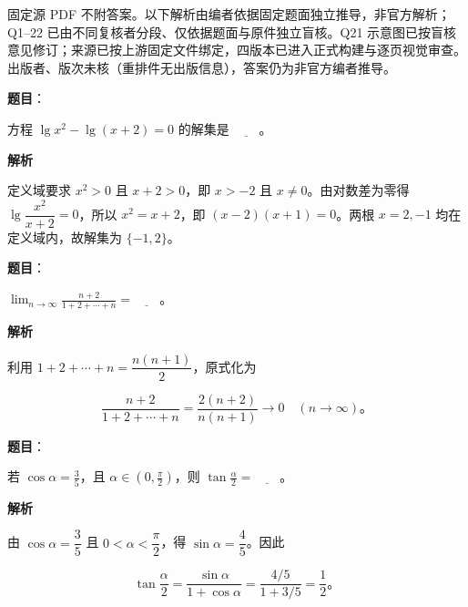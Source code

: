 

\begin{gktip}
固定源 PDF 不附答案。以下解析由编者依据固定题面独立推导，非官方解析；Q1–22 已由不同复核者分段、仅依据题面与原件独立盲核。Q21 示意图已按盲核意见修订；来源已按上游固定文件绑定，四版本已进入正式构建与逐页视觉审查。出版者、版次未核（重排件无出版信息），答案仍为非官方编者推导。
\end{gktip}

\begin{answer}

\textbf{题目}：

方程 $\lg x^2-\lg(x+2)=0$ 的解集是 $\underline{\qquad}$。

\textbf{解析}

定义域要求 $x^2>0$ 且 $x+2>0$，即 $x>-2$ 且 $x\ne0$。由对数差为零得 $\lg\dfrac{x^2}{x+2}=0$，所以 $x^2=x+2$，即 $(x-2)(x+1)=0$。两根 $x=2,-1$ 均在定义域内，故解集为 $\{-1,2\}$。


\end{answer}
\begin{answer}

\textbf{题目}：

$\displaystyle\lim_{n\to\infty}\frac{n+2}{1+2+\cdots+n}=\underline{\qquad}$。

\textbf{解析}

利用 $1+2+\cdots+n=\dfrac{n(n+1)}2$，原式化为

\nopagebreak[4]
\[
\frac{n+2}{1+2+\cdots+n}=\frac{2(n+2)}{n(n+1)}\longrightarrow0\quad(n\to\infty)\mbox{。}
\]


\end{answer}
\begin{answer}

\textbf{题目}：

若 $\cos\alpha=\frac35$，且 $\alpha\in\left(0,\frac\pi2\right)$，则 $\tan\frac\alpha2=\underline{\qquad}$。

\textbf{解析}

由 $\cos\alpha=\dfrac35$ 且 $0<\alpha<\dfrac\pi2$，得 $\sin\alpha=\dfrac45$。因此

\nopagebreak[4]
\[
\tan\frac\alpha2=\frac{\sin\alpha}{1+\cos\alpha}
=\frac{4/5}{1+3/5}=\frac12\mbox{。}
\]


\end{answer}
